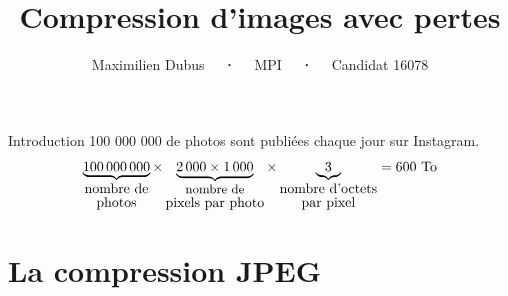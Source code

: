 \documentclass[xcolor=dvipsnames]{beamer}
\title{Compression d'images avec pertes}
\subtitle{Maximilien Dubus \ \ \textbf{·} \ \ MPI \ \ \textbf{·} \ \ Candidat 16078}
\date{ } %
\begin{document}
\begin{frame}
    
    \vspace{-100pt}
    \titlepage
\end{frame}

\begin{frame}{Introduction}
    \centering
    100 000 000 de photos sont publiées chaque jour sur Instagram. \\
    \footnotesize
    \[
        \underbrace{100\,000\,000}_{\shortstack{\text{nombre de}\\\text{photos}}}
        \times
        \underbrace{2\,000 \times 1\,000}_{\shortstack{\text{\small nombre de}\\\text{pixels par photo}}}
        \times
        \underbrace{3}_{\shortstack{\text{nombre d'octets}\\\text{par pixel}}}
        =  600\ \text{To}
    \]

\end{frame}

\section{La compression JPEG}
\end{document}
